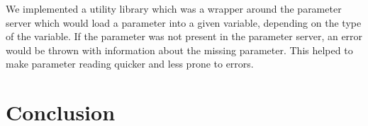 We implemented a utility library which was a wrapper around the parameter server
which would load a parameter into a given variable, depending on the type of the
variable. If the parameter was not present in the parameter server, an error
would be thrown with information about the missing parameter. This helped to
make parameter reading quicker and less prone to errors.

\section{Conclusion}

\nocite{*}
\printbibliography


